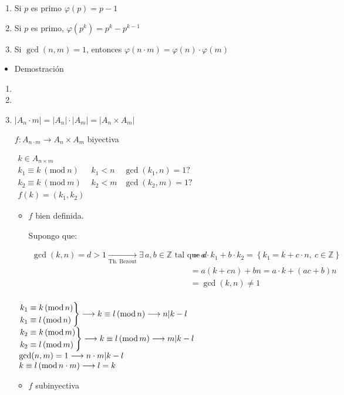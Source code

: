 \documentclass[12pt]{article}
\begin{document}
\begin{enumerate}[label=\color{lightblue}\arabic*)]
	\item Si $p$ es primo $\varphi(p)=p-1$
	\item Si $p$ es primo, $\varphi(p^k)=p^k-p^{k-1}$
	\item Si $\gcd(n,m)=1$, entonces $\varphi(n\cdot m)=\varphi(n)\cdot\varphi(m)$
\end{enumerate}
\begin{itemize}[label=\color{red}\textbullet, leftmargin=*]
	\item \color{lightblue}Demostración
\end{itemize}
\begin{enumerate}[label=\color{lightblue}\arabic*)]
	\item 
	\item 
	\item $|A_n\cdot m|=|A_n|\cdot|A_m|=|A_n\times A_m|$
	
	$f:A_{n\cdot m}\longrightarrow A_n\times A_m$ biyectiva
	
	$\begin{array}{lll}
		k\in A_{n\times m} & &\\
		k_1\equiv k\:(\mathrm{mod}\:n) & k_1<n & \gcd(k_1,n)=1?\\
		k_2\equiv k\:(\mathrm{mod}\:m) & k_2<m & \gcd(k_2,m)=1?\\
		f(k)=(k_1,k_2)
	\end{array}$
	\begin{itemize}[leftmargin=*]
		\item $f$ bien definida.
		
		Supongo que: 
		
		$\begin{aligned}
			\gcd(k,n)=d>1\xrightarrow[\text{Th. Bezout}]{}\exists\,a,b\in\mathbb{Z}\text{ tal que }d&=a\cdot k_1+b\cdot k_2=\left\{k_1=k+ c\cdot n,\:c\in\mathbb{Z}\right\}\\
			&=a(k+cn)+bn=a\cdot k+(ac+b)n\\
			&=\gcd(k,n)\neq1\\
		\end{aligned}$
	\end{itemize}
	$\begin{array}{l}
		\begin{rcases}
			k_1\equiv k\,(\mathrm{mod}\,n)\\
			k_1\equiv l\,(\mathrm{mod}\,n)
		\end{rcases}\longrightarrow k\equiv l\,(\mathrm{mod}\, n)\longrightarrow n|k-l\\
		\begin{rcases}
			k_2\equiv k\,(\mathrm{mod}\,m)\\
			k_2\equiv l\,(\mathrm{mod}\,m)
		\end{rcases}\longrightarrow k\equiv l\,(\mathrm{mod}\, m)\longrightarrow m|k-l\\
		\gcd(n,m)=1\longrightarrow n\cdot m|k-l\\
		k\equiv l\,(\mathrm{mod}\, n\cdot m)\longrightarrow l=k
	\end{array}$
	\begin{itemize}[leftmargin=*]
		\item $f$ subinyectiva
		

\end{itemize}
\end{enumerate}
\end{document}
